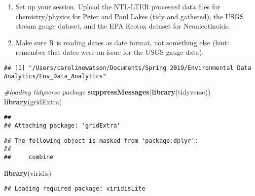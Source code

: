 \documentclass[]{article}
\newenvironment{Shaded}{\begin{snugshade}}{\end{snugshade}}
\newcommand{\KeywordTok}[1]{\textcolor[rgb]{0.13,0.29,0.53}{\textbf{#1}}}
\newcommand{\CommentTok}[1]{\textcolor[rgb]{0.56,0.35,0.01}{\textit{#1}}}
\newcommand{\NormalTok}[1]{#1}
\begin{document}
\begin{enumerate}
\def\labelenumi{\arabic{enumi}.}
\item
  Set up your session. Upload the NTL-LTER processed data files for
  chemistry/physics for Peter and Paul Lakes (tidy and gathered), the
  USGS stream gauge dataset, and the EPA Ecotox dataset for
  Neonicotinoids.
\item
  Make sure R is reading dates as date format, not something else (hint:
  remember that dates were an issue for the USGS gauge data).
\end{enumerate}

\begin{Shaded}
\end{Shaded}

\begin{verbatim}
## [1] "/Users/carolinewatson/Documents/Spring 2019/Environmental Data Analytics/Env_Data_Analytics"
\end{verbatim}

\begin{Shaded}
\begin{Highlighting}[]
\CommentTok{#loading tidyverse package}
\KeywordTok{suppressMessages}\NormalTok{(}\KeywordTok{library}\NormalTok{(tidyverse))}
\KeywordTok{library}\NormalTok{(gridExtra)}
\end{Highlighting}
\end{Shaded}

\begin{verbatim}
## 
## Attaching package: 'gridExtra'
\end{verbatim}

\begin{verbatim}
## The following object is masked from 'package:dplyr':
## 
##     combine
\end{verbatim}

\begin{Shaded}
\begin{Highlighting}[]
\KeywordTok{library}\NormalTok{(viridis)}
\end{Highlighting}
\end{Shaded}

\begin{verbatim}
## Loading required package: viridisLite
\end{verbatim}
\end{document}
